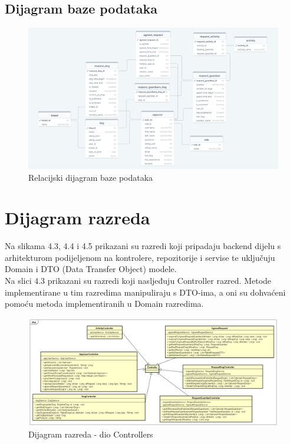 			\eject
			\subsection{Dijagram baze podataka}
			
			\begin{figure}[htb]
				\centering
				\includegraphics[width=15cm]{slike/drawsql REL}
				\caption{Relacijski dijagram baze podataka} 
				\label{fig:E-Rdijagram}
			\end{figure}
			
			\eject
			
			
		\section{Dijagram razreda}
		
			Na slikama 4.3, 4.4 i 4.5 prikazani su razredi koji pripadaju backend dijelu s arhitekturom podijeljenom na kontrolere, repozitorije i servise te uključuju Domain i DTO (Data Transfer Object) modele.\\
			Na slici 4.3 prikazani su razredi koji nasljeđuju Controller razred. Metode implementirane u tim razredima manipuliraju s DTO-ima, a oni su dohvaćeni pomoću metoda implementiranih u Domain razredima.
			
			\begin{figure}[htb]
				\centering
				\includegraphics[width=15cm]{slike/dijagram_razreda_controllers}
				\caption{Dijagram razreda - dio Controllers} 
				\label{fig:Class-Diagram}
			\end{figure}
		

